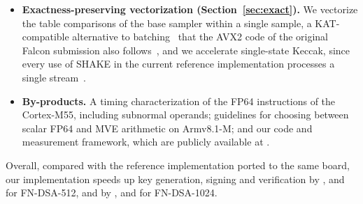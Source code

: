 \begin{itemize}
    FP64 unit while reproducing the KATs bit for bit, which multi-word
    single-precision alternatives cannot do.
  \item \textbf{Exactness-preserving vectorization
    (Section~\ref{sec:exact}).}
    We vectorize the table comparisons of the base sampler within a single
    sample, a KAT-compatible alternative to batching~\cite{ZZ26} that the
    AVX2 code of the original Falcon submission also
    follows~\cite{FalconImpl}, and we accelerate single-state Keccak, since
    every use of SHAKE in the current reference implementation processes a
    single stream~\cite{cfndsa}.
  \item \textbf{By-products.}
    A timing characterization of the FP64 instructions of the Cortex-M55,
    including subnormal operands; guidelines for choosing between scalar
    FP64 and MVE arithmetic on Armv8.1-M; and our code and measurement
    framework, which are publicly available at
    .
\end{itemize}
Overall, compared with the reference implementation ported to the same
board, our implementation speeds up key generation, signing and verification
by ,  and  for FN-DSA-512, and
by ,  and  for FN-DSA-1024.

